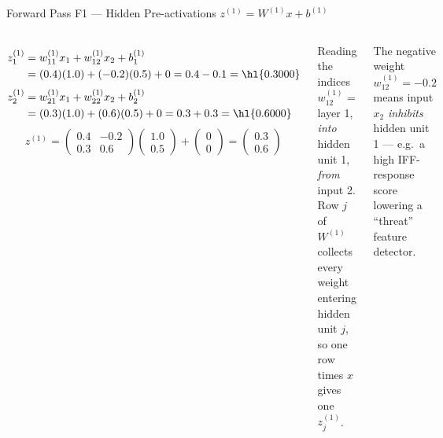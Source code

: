 \documentclass[aspectratio=169,10pt]{beamer}
\begin{document}
\begin{frame}{Forward Pass F1 --- Hidden Pre-activations $z^{(1)}=W^{(1)}x+b^{(1)}$}
\begin{columns}[T]
{\small
\begin{align*}
z^{(1)}_1&=w^{(1)}_{11}x_1+w^{(1)}_{12}x_2+b^{(1)}_1\\
&=(0.4)(1.0)+(-0.2)(0.5)+0=0.4-0.1=\hl{0.3000}\\[3pt]
z^{(1)}_2&=w^{(1)}_{21}x_1+w^{(1)}_{22}x_2+b^{(1)}_2\\
&=(0.3)(1.0)+(0.6)(0.5)+0=0.3+0.3=\hl{0.6000}
\end{align*}}
{\small\[
z^{(1)}=\begin{pmatrix}0.4&-0.2\\0.3&0.6\end{pmatrix}\begin{pmatrix}1.0\\0.5\end{pmatrix}+\begin{pmatrix}0\\0\end{pmatrix}=\begin{pmatrix}0.3\\0.6\end{pmatrix}
\]}
\begin{cbox}{Reading the indices}
$w^{(1)}_{12}$ = layer 1, \emph{into} hidden unit 1, \emph{from} input 2. Row $j$ of $W^{(1)}$ collects every weight entering hidden unit $j$, so one row times $x$ gives one $z^{(1)}_j$.
\end{cbox}
\begin{ibox}\scriptsize The negative weight $w^{(1)}_{12}=-0.2$ means input $x_2$ \emph{inhibits} hidden unit 1 --- e.g.\ a high IFF-response score lowering a ``threat'' feature detector.\end{ibox}
\end{columns}
\end{frame}
\end{document}
